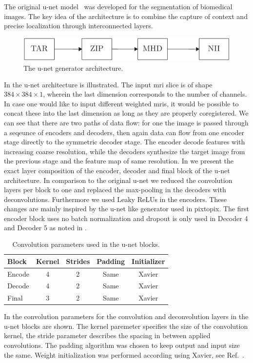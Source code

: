 The original u-net model~\cite{Ronneberger15} was developed for the
segmentation of biomedical images. The key idea of the architecture is to
combine the capture of context and precise localization through interconnected
layers.
\begin{figure}[h]
  \centering
  \includegraphics[page=3,width=\linewidth]{figure/diagrams.pdf}
  \caption{The u-net generator architecture.
  }\label{fig:unet:gen}
\end{figure}
In  the u-net architecture is illustrated. The
input \gls{mri} slice is of shape $384\times384\times1$, wherein the last
dimension corresponds to the number of channels. In case one would like to
input different weighted \gls{mri}s, it would be possible to concat these into
the last dimension as long as they are properly coregistered.
We can see that there are two paths of data flow: for one the image is passed
through a seqeunce of encoders and decoders, then again data can flow from
one encoder stage directly to the symmetric decoder stage. The encoder decode
features with increasing coarse resolution, while the decoders synthesize the
target image from the previous stage and the feature map of same resolution.
In  we present the exact layer composition of the
encoder, decoder and final block of the u-net architecture. In comparison to
the original u-net we reduced the convolution layers per block to one and
replaced the max-pooling in the decoders with deconvolutions. Furthermore
we used Leaky ReLUs in the encoders. These changes are mainly inspired by the
u-net like generator used in pixtopix. The first encoder block uses no batch
normalization and dropout is only used in Decoder \num{4} and Decoder \num{5}
as noted in .
\begin{table}[h]
  \centering
  \begin{tabular}{lcccc}
    \toprule
    Block & Kernel & Strides & Padding & Initializer \\
    \midrule
    Encode & \num{4} & \num{2} & Same & Xavier \\
    Decode & \num{4} & \num{2} & Same & Xavier \\
    Final  & \num{3} & \num{2} & Same & Xavier \\
    \bottomrule
  \end{tabular}
  \caption{Convolution parameters used in the u-net blocks.
  }\label{tab:unet:conv}
\end{table}
In  the convolution parameters for the convolution and
deconvolution layers in the u-net blocks are shown. The kernel paremeter
specifies the size of the convolution kernel, the stride parameter describes
the spacing in between applied convolutions. The padding algorithm was chosen
to keep output and input size the same. Weight initialization was performed
according using Xavier, see Ref.~\cite{Xavier2010}.

